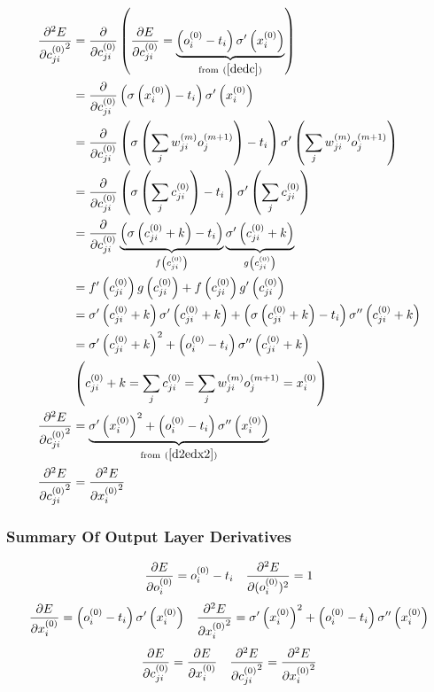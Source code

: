 \begin{align}
\pdv[2]{E}{{c_{ji}^{(0)}}} &=
\pdv{}{c_{ji}^{(0)}} 
\left(\pdv{E}{c_{ji}^{(0)}} = 
\underbrace{\left(o_{i}^{(0)} - t_{i} \right) \sigma^{\prime}\left(x_{i}^{(0)}\right)}
_{\text{from} \ (\ref{dedc})}
\right)
\\
&=\pdv{}{c_{ji}^{(0)}}\left(\sigma\left(x_{i}^{(0)}\right) - t_{i} \right) \sigma^{\prime}\left(x_{i}^{(0)}\right)
\\
&=\pdv{}{c_{ji}^{(0)}}\left(\sigma\left(\sum\limits_j {w_{ji}^{(m)}}{ o_{j}^{(m + 1)}}\right) - t_{i} \right) \sigma^{\prime}\left(\sum\limits_j {w_{ji}^{(m)}}{ o_{j}^{(m + 1)}}\right)
\\
&=\pdv{}{c_{ji}^{(0)}}\left(\sigma\left(\sum\limits_j {c_{ji}^{(0)}}\right) - t_{i} \right) \sigma^{\prime}\left(\sum\limits_j {c_{ji}^{(0)}}\right)
\\
&=\pdv{}{c_{ji}^{(0)}}
\underbrace{\left(\sigma\left({c_{ji}^{(0)}} + k\right) - t_{i} \right)}
_{f\left(c_{ji}^{(0)}\right)}
\underbrace{\sigma^{\prime}\left({c_{ji}^{(0)}} + k\right)}
_{g\left(c_{ji}^{(0)}\right)}
\\
&=f^{\prime}\left(c_{ji}^{(0)}\right)g\left(c_{ji}^{(0)}\right) + f\left(c_{ji}^{(0)}\right)g^{\prime}\left(c_{ji}^{(0)}\right)
\\
&=\sigma^{\prime}\left({c_{ji}^{(0)}} + k\right)\sigma^{\prime}\left({c_{ji}^{(0)}} + k\right) + 
\left(\sigma\left({c_{ji}^{(0)}} + k\right) - t_{i} \right)\sigma^{\prime\prime}\left({c_{ji}^{(0)}} + k\right)
\\
&=\sigma^{\prime}\left({c_{ji}^{(0)}} + k\right)^2 + 
\left(o_{i}^{(0)} - t_{i} \right)\sigma^{\prime\prime}\left({c_{ji}^{(0)}} + k\right)
\\
&\left(c_{ji}^{(0)} + k = \sum_j{c_{ji}^{(0)}} = \sum\limits_j {w_{ji}^{(m)}}{ o_{j}^{(m + 1)}} = x_{i}^{(0)} \right)
\\
\pdv[2]{E}{{c_{ji}^{(0)}}}&=
\underbrace{\sigma^{\prime}\left(x_{i}^{(0)}\right)^2 + 
\left(o_{i}^{(0)} - t_{i} \right)\sigma^{\prime\prime}\left(x_{i}^{(0)}\right)}
_{\text{from} \ (\ref{d2edx2})}
\\
\pdv[2]{E}{{c_{ji}^{(0)}}} &= \pdv[2]{E}{{x_{i}^{(0)}}}
\end{align}
\subsubsection{Summary Of Output Layer Derivatives}
\begin{align}
&\pdv{E}{o_{i}^{(0)}} = o_{i}^{(0)} - t_{i} 
&
\pdv[2]{E}{(o_{i}^{(0)})} = 1
\end{align}
\begin{align}
&\pdv{E}{x_{i}^{(0)}} = \left(o_{i}^{(0)} - t_{i}\right)\sigma^{\prime}\left(x_{i}^{(0)}\right)
& 
\pdv[2]{E}{{x_{i}^{(0)}}} = \sigma^{\prime}\left(x_{i}^{(0)}\right)^2 + \left(o_{i}^{(0)} - t_{i}\right)\sigma^{\prime\prime}\left(x_{i}^{(0)}\right)
\end{align}
\begin{align}
&\pdv{E}{{c_{ji}^{(0)}}} = \pdv{E}{{x_{i}^{(0)}}}
&
\pdv[2]{E}{{c_{ji}^{(0)}}} = \pdv[2]{E}{{x_{i}^{(0)}}}
\end{align}
